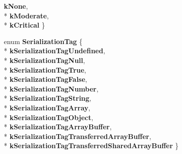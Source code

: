 \begin{DoxyCompactItemize}
{\bfseries k\+None}, 
\\*
{\bfseries k\+Moderate}, 
\\*
{\bfseries k\+Critical}
 \}
\item 
enum {\bfseries Serialization\+Tag} \{ \\*
{\bfseries k\+Serialization\+Tag\+Undefined}, 
\\*
{\bfseries k\+Serialization\+Tag\+Null}, 
\\*
{\bfseries k\+Serialization\+Tag\+True}, 
\\*
{\bfseries k\+Serialization\+Tag\+False}, 
\\*
{\bfseries k\+Serialization\+Tag\+Number}, 
\\*
{\bfseries k\+Serialization\+Tag\+String}, 
\\*
{\bfseries k\+Serialization\+Tag\+Array}, 
\\*
{\bfseries k\+Serialization\+Tag\+Object}, 
\\*
{\bfseries k\+Serialization\+Tag\+Array\+Buffer}, 
\\*
{\bfseries k\+Serialization\+Tag\+Transferred\+Array\+Buffer}, 
\\*
{\bfseries k\+Serialization\+Tag\+Transferred\+Shared\+Array\+Buffer}
 \}\hypertarget{namespacev8_ae102b2422e5d2a06c465fa9d891db81d}{}\label{namespacev8_ae102b2422e5d2a06c465fa9d891db81d}

\end{DoxyCompactItemize}
